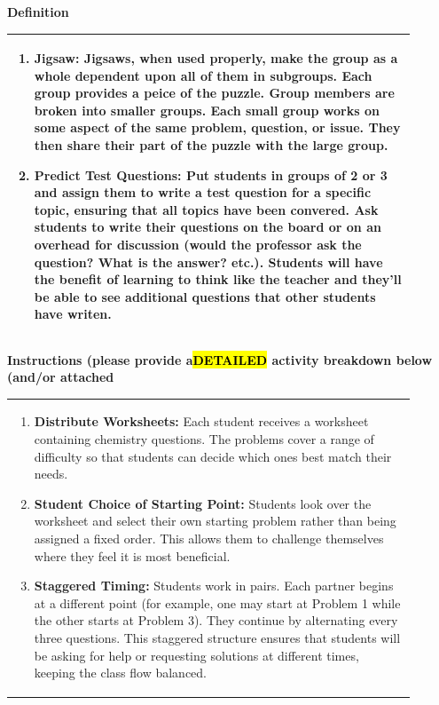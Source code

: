 \documentclass{article}
\begin{document}
{{{\large\textbf{Definition}}\\
\noindent
\begin{tabular}{|p{0.9\linewidth}|}
\hline
\begin{enumerate}
    \item\textbf{Jigsaw:} Jigsaws, when used properly, make the group as a whole dependent upon all of them in subgroups. Each group provides a peice of the puzzle. Group members are broken into smaller groups. Each small group works on some aspect of the same problem, question, or issue. They then share their part of the puzzle with the large group.
    \item\textbf{Predict Test Questions:}  Put students in groups of 2 or 3 and assign them to write a test question for a specific topic, ensuring that all topics have been convered. Ask students to write their questions on the board or on an overhead for discussion (would the professor ask the question? What is the answer? etc.). Students will have the benefit of learning to think like the teacher and they'll be able to see additional questions that other students have writen.
 
\end{enumerate}\\
\hline
\end{tabular}
\vspace{0.2cm}
\newpage
{\large\textbf{Instructions (please provide a\hl{DETAILED} activity breakdown below (and/or attached}}\\
\noindent
\begin{tabular}{|p{0.9\linewidth}|}
\hline
\vspace{0.2cm}
\begin{enumerate}
    \item \textbf{Distribute Worksheets:} Each student receives a worksheet containing chemistry questions. The problems cover a range of difficulty so that students can decide which ones best match their needs.
    
    \item \textbf{Student Choice of Starting Point:} Students look over the worksheet and select their own starting problem rather than being assigned a fixed order. This allows them to challenge themselves where they feel it is most beneficial.
    
    \item \textbf{Staggered Timing:} Students work in pairs. Each partner begins at a different point (for example, one may start at Problem 1 while the other starts at Problem 3). They continue by alternating every three questions. This staggered structure ensures that students will be asking for help or requesting solutions at different times, keeping the class flow balanced.
    

\end{enumerate}
\end{tabular}}}
\end{document}

